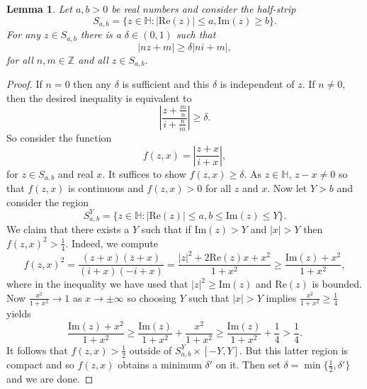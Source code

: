 \documentclass[12pt]{book}
\newtheorem{lemma}{Lemma}[section]
\theoremstyle{definition}\newframedtheorem{method}{Method}
\newcommand{\Z}{\mathbb{Z}}
\renewcommand{\H}{\mathbb{H}}
\renewcommand{\d}{\delta}
\newcommand{\x}{\times}
\newcommand{\<}{\langle}
\renewcommand{\>}{\rangle}
\newcommand{\conj}{\overline}
\renewcommand{\Re}{\mathrm{Re}}
\renewcommand{\Im}{\mathrm{Im}}
\begin{document}
      \begin{lemma}\label{lem:technical_Eisenstein_convergence_lemma}
        Let $a,b > 0$ be real numbers and consider the half-strip
        \[
          S_{a,b} = \{z \in \H:|\Re(z)| \le a, \Im(z) \ge b\}.
        \]
        For any $z \in S_{a,b}$ there is a $\d \in (0,1)$ such that
        \[
          |nz+m| \ge \d|ni+m|,
        \]
        for all $n,m \in \Z$ and all $z \in S_{a,b}$.
      \end{lemma}
      \begin{proof}
        If $n = 0$ then any $\d$ is sufficient and this $\d$ is independent of $z$. If $n \neq 0$, then the desired inequality is equivalent to
        \[
          \left|\frac{z+\frac{m}{n}}{i+\frac{n}{m}}\right| \ge \d.
        \]
        So consider the function
        \[
          f(z,x) = \left|\frac{z+x}{i+x}\right|,
        \]
        for $z \in S_{a,b}$ and real $x$. It suffices to show $f(z,x) \ge \d$. As $z \in \H$, $z-x \neq 0$ so that $f(z,x)$ is continuous and $f(z,x) > 0$ for all $z$ and $x$. Now let $Y > b$ and consider the region
        \[
          S_{a,b}^{Y} = \{z \in \H:|\Re(z)| \le a, b \le \Im(z) \le Y\}.
        \]
        We claim that there exists a $Y$ such that if $\Im(z) > Y$ and $|x| > Y$ then $f(z,x)^{2} > \frac{1}{4}$. Indeed, we compute
        \[
          f(z,x)^{2} = \frac{(z+x)(\conj{z}+x)}{(i+x)(-i+x)} = \frac{|z|^{2}+2\Re(z)x+x^{2}}{1+x^{2}} \ge \frac{\Im(z)+x^{2}}{1+x^{2}},
        \]
        where in the inequality we have used that $|z|^{2} \ge \Im(z)$ and $\Re(z)$ is bounded. Now $\frac{x^{2}}{1+x^{2}} \to 1$ as $x \to \pm\infty$ so choosing $Y$ such that $|x| > Y$ implies $\frac{x^{2}}{1+x^{2}} \ge \frac{1}{4}$ yields
        \[
          \frac{\Im(z)+x^{2}}{1+x^{2}} \ge \frac{\Im(z)}{1+x^{2}}+\frac{x^{2}}{1+x^{2}} \ge \frac{\Im(z)}{1+x^{2}}+\frac{1}{4} > \frac{1}{4}.
        \]
        It follows that $f(z,x) > \frac{1}{2}$ outside of $S_{a,b}^{Y} \x [-Y,Y]$. But this latter region is compact and so $f(z,x)$ obtains a minimum $\d'$ on it. Then set $\d = \min\{\frac{1}{2},\d'\}$ and we are done.
      \end{proof}
\end{document}
